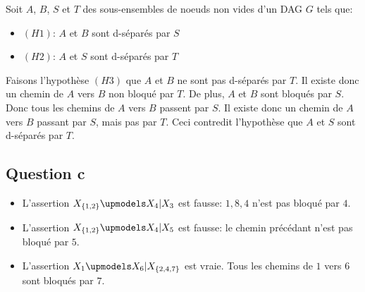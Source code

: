 \documentclass{article}
\begin{document}
Soit $A$, $B$, $S$ et $T$ des sous-ensembles de noeuds non vides d'un DAG $G$
tels que:

\begin{itemize}
\item $(H1)$: $A$ et $B$ sont d-séparés par $S$
\item $(H2)$: $A$ et $S$ sont d-séparés par $T$
\end{itemize}

Faisons l'hypothèse $(H3)$ que $A$ et $B$ ne sont pas d-séparés par $T$. Il
existe donc un chemin de $A$ vers $B$ non bloqué par $T$. De plus, $A$ et $B$
sont bloqués par $S$. Donc tous les chemins de $A$ vers $B$ passent par $S$. Il
existe donc un chemin de $A$ vers $B$ passant par $S$, mais pas par $T$. Ceci
contredit l'hypothèse que $A$ et $S$ sont d-séparés par $T$.

\subsection{Question c}

\begin{itemize}
\item L'assertion $X_{\{1, 2\}} \upmodels X_4 | X_3$ est fausse: ${1, 8, 4}$ n'est pas
bloqué par $4$.
\item L'assertion $X_{\{1, 2\}} \upmodels X_4 | X_5$ est fausse: le chemin précédant
n'est pas bloqué par $5$.
\item L'assertion $X_1 \upmodels X_6 | X_{\{2, 4, 7\}}$ est vraie. Tous les chemins
de $1$ vers $6$ sont bloqués par $7$.
\end{itemize}
\end{document}
